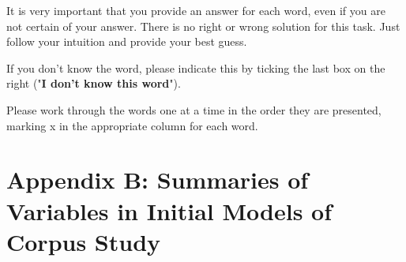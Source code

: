 It is very important that you provide an answer for each word, even if you are not certain of your answer. There is no right or wrong solution for this task. Just follow your intuition and provide your best guess.



If you don’t know the word, please indicate this by ticking the last box on the right ("\textbf{I don't know this word}").



Please work through the words one at a time in the order they are presented, marking x in the appropriate column for each word.\\



\clearpage



\section*{Appendix B: Summaries of Variables in Initial Models of Corpus Study}\label{App B: Summaries of variables in initial models of corpus study}


